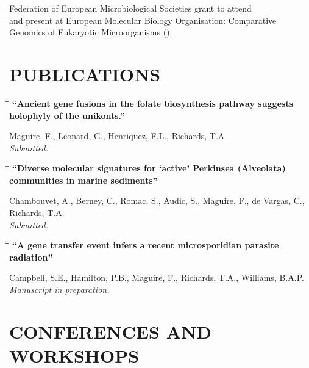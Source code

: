 \documentclass{res}
\begin{document}
\begin{resume}
    Federation of European Microbiological Societies grant to attend\\ and present at European Molecular Biology Organisation: Comparative \\Genomics of Eukaryotic Microorganisms ().

\newpage
\section{PUBLICATIONS} 
\vspace{-0.05in}
\begin{tabbing}
   \hspace{2.3in}\= \hspace{2.6in}\= \kill
   {\bf ``Ancient gene fusions in the folate biosynthesis pathway suggests holophyly of the unikonts.''\\
  }
   \end{tabbing}\vspace{-20pt}
   Maguire, F., Leonard, G., Henriquez, F.L., Richards, T.A. \\
\emph{Submitted.}

\vspace{-0.1in}
\begin{tabbing}
   \hspace{2.3in}\= \hspace{2.6in}\= \kill
   {\bf ``Diverse molecular signatures for `active' Perkinsea (Alveolata) communities in marine sediments''} 
   \end{tabbing}\vspace{-20pt}
     Chambouvet, A., Berney, C., Romac, S., Audic, S., Maguire, F., de Vargas, C., Richards, T.A.\\
\emph{Submitted.}

\vspace{-0.1in}
\begin{tabbing}
   \hspace{2.3in}\= \hspace{2.6in}\= \kill
   {\bf ``A gene transfer event infers a recent microsporidian parasite radiation''}
   \end{tabbing}\vspace{-20pt}
Campbell, S.E., Hamilton, P.B., Maguire, F., Richards, T.A., Williams, B.A.P.\\
\emph{Manuscript in preparation.}






\section{CONFERENCES AND WORKSHOPS}
  \vspace{-0.05in}
  

\end{resume}
\end{document}
